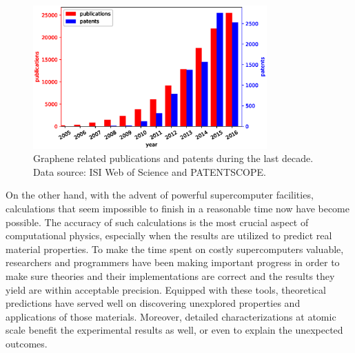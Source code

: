 \begin{figure}[htbp!] 
\centering  
\includegraphics[width=0.8\textwidth]{graphene_papers.eps}
\caption[Graphene related publications and patents during the last decade]{Graphene related publications and patents during the last decade. Data source: ISI Web of Science and PATENTSCOPE. \protect\footnotemark }
\label{fig:grpapers}
\end{figure} 

On the other hand, with the advent of powerful supercomputer facilities, calculations that seem impossible to finish in a reasonable time now have become possible. The accuracy of such calculations is the most crucial aspect of computational physics, especially when the results are utilized to predict real material properties. To make the time spent on costly supercomputers valuable, researchers and programmers have been making important progress in order to make sure theories and their implementations are correct and the results they yield are within acceptable precision. Equipped with these tools, theoretical predictions have served well on discovering unexplored properties and applications of those materials. Moreover, detailed characterizations at atomic scale benefit the experimental results as well, or even to explain the unexpected outcomes.


